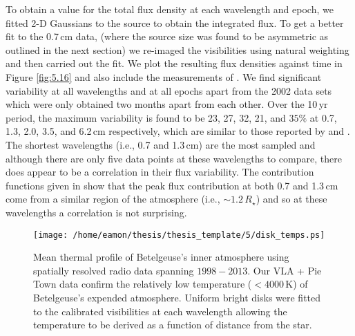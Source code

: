 To obtain a value for the total flux density at each wavelength and epoch, we fitted 2-D Gaussians to the source to obtain the integrated flux. To get a better fit to the 0.7\,cm data, (where the source size was found to be asymmetric as outlined in the next section) we re-imaged the visibilities using natural weighting and then carried out the fit. We plot the resulting flux densities against time in Figure \ref{fig:5.16} and also include the measurements of \cite{lim_1998}. We find significant variability at all wavelengths and at all epochs apart from the 2002 data sets which were only obtained two months apart from each other. Over the 10\,yr period, the maximum variability is found to be 23, 27, 32, 21, and $35\%$ at 0.7, 1.3, 2.0, 3.5, and 6.2\,cm respectively, which are similar to those reported by \cite{drake_1992} and \cite{bookbinder_1987}. The shortest wavelengths (i.e., 0.7 and 1.3\,cm) are the most sampled and although there are only five data points at these wavelengths to compare, there does appear to be a correlation in their flux variability. The contribution functions given in \cite{harper_2001} show that the peak flux contribution at both 0.7 and 1.3\,cm come from a similar region of the atmosphere (i.e., $\sim 1.2\,R_{\star}$) and so at these wavelengths a correlation is not surprising.

\begin{figure}[b!]
\centering
          \texttt{[image: /home/eamon/thesis/thesis\_template/5/disk\_temps.ps]}
\caption[Atmospheric temperature profile between $1998-2013$]{Mean thermal profile of Betelgeuse's inner atmosphere using spatially resolved radio data spanning $1998-2013$. Our VLA + Pie Town data confirm the relatively low temperature ($<4000$\,K) of Betelgeuse's expended atmosphere. Uniform bright disks were fitted to the calibrated visibilities at each wavelength allowing the temperature to be derived as a function of distance from the star.}
\label{fig:5.16a}
\end{figure}


